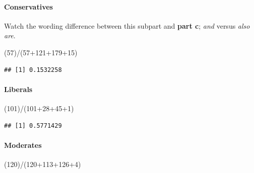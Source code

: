 \documentclass[
]{article}
\newenvironment{Shaded}{\begin{snugshade}}{\end{snugshade}}
\newcommand{\DecValTok}[1]{\textcolor[rgb]{0.00,0.00,0.81}{#1}}
\newcommand{\NormalTok}[1]{#1}
\newcommand{\SpecialCharTok}[1]{\textcolor[rgb]{0.00,0.00,0.00}{#1}}
\begin{document}
\hypertarget{conservatives}{%
\paragraph{Conservatives}\label{conservatives}}

Watch the wording difference between this subpart and \textbf{part c};
\emph{and} versus \emph{also are}.

\begin{Shaded}
\begin{Highlighting}[]
\NormalTok{(}\DecValTok{57}\NormalTok{)}\SpecialCharTok{/}\NormalTok{(}\DecValTok{57}\SpecialCharTok{+}\DecValTok{121}\SpecialCharTok{+}\DecValTok{179}\SpecialCharTok{+}\DecValTok{15}\NormalTok{)}
\end{Highlighting}
\end{Shaded}

\begin{verbatim}
## [1] 0.1532258
\end{verbatim}

\hypertarget{liberals}{%
\paragraph{Liberals}\label{liberals}}

\begin{Shaded}
\begin{Highlighting}[]
\NormalTok{(}\DecValTok{101}\NormalTok{)}\SpecialCharTok{/}\NormalTok{(}\DecValTok{101}\SpecialCharTok{+}\DecValTok{28}\SpecialCharTok{+}\DecValTok{45}\SpecialCharTok{+}\DecValTok{1}\NormalTok{)}
\end{Highlighting}
\end{Shaded}

\begin{verbatim}
## [1] 0.5771429
\end{verbatim}

\hypertarget{moderates}{%
\paragraph{Moderates}\label{moderates}}

\begin{Shaded}
\begin{Highlighting}[]
\NormalTok{(}\DecValTok{120}\NormalTok{)}\SpecialCharTok{/}\NormalTok{(}\DecValTok{120}\SpecialCharTok{+}\DecValTok{113}\SpecialCharTok{+}\DecValTok{126}\SpecialCharTok{+}\DecValTok{4}\NormalTok{)}
\end{Highlighting}
\end{Shaded}
\end{document}
